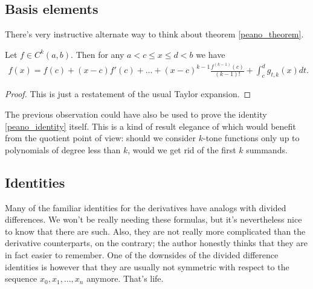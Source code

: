 \subsection{Basis elements}

There's very instructive alternate way to think about theorem \ref{peano_theorem}.

\begin{lause}\label{basis_k-tone}
	Let $f \in C^{k}(a, b)$. Then for any $a < c \leq x \leq d < b$ we have
	\begin{align*}
		f(x) = f(c) + (x - c) f'(c) + \ldots + (x - c)^{k - 1} \frac{f^{(k - 1)}(c)}{(k - 1)!} + \int_{c}^{d} g_{t, k}(x) dt.
	\end{align*}
\end{lause}
\begin{proof}
	This is just a restatement of the usual Taylor expansion.
\end{proof}

The previous observation could have also be used to prove the identity \ref{peano_identity} itself. This is a kind of result elegance of which would benefit from the quotient point of view: should we consider $k$-tone functions only up to polynomials of degree less than $k$, would we get rid of the first $k$ summands.

\subsection{Identities}

Many of the familiar identities for the derivatives have analogs with divided differences. We won't be really needing these formulas, but it's nevertheless nice to know that there are such. Also, they are not really more complicated than the derivative counterparts, on the contrary; the author honestly thinks that they are in fact easier to remember. One of the downsides of the divided difference identities is however that they are usually not symmetric with respect to the sequence $x_{0}, x_{1}, \ldots, x_{n}$ anymore. That's life.

